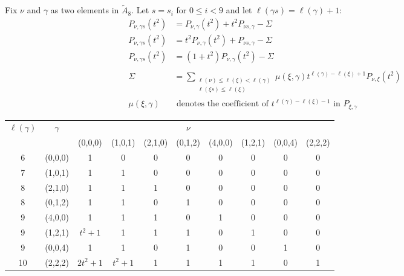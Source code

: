\documentclass[12pt]{article} %
\begin{document}
Fix $\nu$ and $\gamma$ as two elements in $\tilde A_8$. Let $s = s_i$ for $0 \leq i < 9$ and let $\ell(\gamma s) = \ell(\gamma) + 1$:
\begin{align*}
P_{\nu,\gamma s}(t^2)  & = P_{\nu,\gamma}(t^2) +  t^2 P_{\nu s,\gamma}  - \Sigma \tag{if $\ell(\nu s) > \ell(\nu$} \\
P_{\nu,\gamma s}(t^2)  & = t^2 P_{\nu,\gamma}(t^2) + P_{\nu s,\gamma}  - \Sigma \tag{if $\ell(\nu s) < \ell(\nu)$} \\
P_{\nu,\gamma s}(t^2)  & = (1+t^2) P_{\nu,\gamma}(t^2) - \Sigma \tag{if $\ell(\nu s) = \ell(\nu)$} \\ \\
\Sigma  & = \sum_{\substack{\ell(\nu) \leq \ell(\xi) < \ell(\gamma) \\ \ell(\xi s) \leq \ell(\xi)}} \mu(\xi,\gamma) t^{\ell(\gamma)-\ell(\xi )+1}P_{\nu,\xi }(t^2) \\
\mu(\xi,\gamma) &\text{ denotes the coefficient of } t^{\ell(\gamma) - \ell(\xi) - 1}\text{ in }P_{\xi,\gamma}
\end{align*}

\begin{table}
	\begin{tabular}{|c|c|cccccccc|} \hline
$\ell(\gamma)$	&$\gamma$	&~		&~		&~		&$\nu$	&~		&~		&~ 		&~		\\
~	&~		&(0,0,0)	&(1,0,1)	&(2,1,0)	&(0,1,2)	&(4,0,0)	&(1,2,1)	&(0,0,4)	&(2,2,2)	\\ \hline
6	&(0,0,0)	&1		&0		&0		&0		&0		&0		&0		&0		\\ 
7	&(1,0,1)	&1		&1		&0		&0		&0		&0		&0		&0		\\ 
8	&(2,1,0)	&1		&1		&1		&0		&0		&0		&0		&0		\\
8	&(0,1,2)	&1		&1		&0		&1		&0		&0		&0		&0		\\ 
9	&(4,0,0)	&1		&1		&1		&0		&1		&0		&0		&0		\\
9	&(1,2,1)	&$t^2 + 1$	&1		&1		&1		&0		&1		&0		&0		\\
9	&(0,0,4)	&1		&1		&0		&1		&0		&0		&1		&0		\\ 
10	&(2,2,2)	&$2t^2 + 1$	&$t^2 + 1$	&1		&1		&1		&1		&0		&1		\\ \hline
	\end{tabular}
\end{table}

\end{document}
